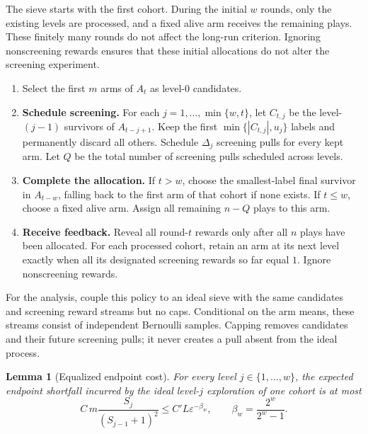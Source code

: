 \documentclass[11pt,letterpaper]{article}
\numberwithin{equation}{section}
\newtheorem{lemma}[lemma]{Lemma}
\theoremstyle{definition}
\theoremstyle{remark}
\newcommand{\1}{\mathbf{1}}
\newcommand{\eps}{\varepsilon}
\begin{document}
The sieve starts with the first cohort. During the initial $w$ rounds,
only the existing levels are processed, and a fixed alive arm receives
the remaining plays. These finitely many rounds do not affect the
long-run criterion. Ignoring nonscreening rewards ensures that these
initial allocations do not alter the screening experiment.

\begin{algorithm}[b]
\caption{Capped all-success sieve in round $t$}
\label{alg:sieve}
\small
\begin{enumerate}[label=\arabic*.,leftmargin=1.7em,itemsep=5pt]
\item Select the first $m$ arms of $A_t$ as level-$0$ candidates.
\item \textbf{Schedule screening.} For each $j=1,\ldots,\min\{w,t\}$,
let $C_{t,j}$ be the level-$(j-1)$ survivors of $A_{t-j+1}$.
Keep the first $\min\{|C_{t,j}|,u_j\}$ labels and permanently discard
all others. Schedule $\Delta_j$ screening pulls for every kept arm.
Let $Q$ be the total number of screening pulls scheduled across levels.
\item \textbf{Complete the allocation.} If $t>w$, choose the smallest-label
final survivor in $A_{t-w}$, falling back to the first arm of that cohort
if none exists. If $t\le w$, choose a fixed alive arm.
Assign all remaining $n-Q$ plays to this arm.
\item \textbf{Receive feedback.} Reveal all round-$t$ rewards only after
all $n$ plays have been allocated. For each processed cohort, retain
an arm at its next level exactly when all its designated screening
rewards so far equal $1$. Ignore nonscreening rewards.
\end{enumerate}
\end{algorithm}

For the analysis, couple this policy to an ideal sieve with the same
candidates and screening reward streams but no caps. Conditional on
the arm means, these streams consist of independent Bernoulli samples.
Capping removes candidates and their future screening pulls; it never
creates a pull absent from the ideal process.

\begin{lemma}[Equalized endpoint cost]\label{lem:equalized-cost}
For every level $j\in\{1,\ldots,w\}$, the expected endpoint shortfall incurred
by the ideal level-$j$ exploration of one cohort is at most
\begin{equation}\label{eq:stage-cost}
  C\,m\frac{S_j}{(S_{j-1}+1)^2}
  \le C' L\eps^{-\beta_w},
  \qquad
  \beta_w=\frac{2^w}{2^w-1}.
\end{equation}
\end{lemma}
\end{document}
